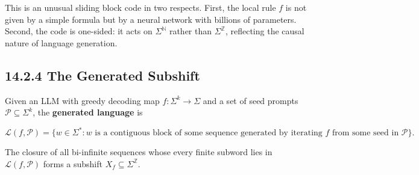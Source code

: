 
\begin{remark}
This is an unusual sliding block code in two respects. First, the local rule $f$ is not given by a simple formula but by a neural network with billions of parameters. Second, the code is one-sided: it acts on $\Sigma^{\mathbb{N}}$ rather than $\Sigma^{\mathbb{Z}}$, reflecting the causal nature of language generation.
\end{remark}

\subsection{14.2.4 The Generated Subshift}

\begin{definition}
Given an LLM with greedy decoding map $f: \Sigma^k \to \Sigma$ and a set of seed prompts $\mathcal{P} \subseteq \Sigma^k$, the \textbf{generated language} is

\[
\mathcal{L}(f, \mathcal{P}) = \{ w \in \Sigma^* : w \text{ is a contiguous block of some sequence generated by iterating } f \text{ from some seed in } \mathcal{P} \} .
\]

The closure of all bi-infinite sequences whose every finite subword lies in $\mathcal{L}(f, \mathcal{P})$ forms a subshift $X_f \subseteq \Sigma^{\mathbb{Z}}$.
\end{definition}

